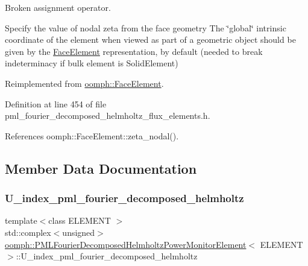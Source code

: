 Broken assignment operator. 

Specify the value of nodal zeta from the face geometry The \char`\"{}global\char`\"{} intrinsic coordinate of the element when viewed as part of a geometric object should be given by the \hyperlink{classoomph_1_1FaceElement}{Face\+Element} representation, by default (needed to break indeterminacy if bulk element is Solid\+Element) 

Reimplemented from \hyperlink{classoomph_1_1FaceElement_a58c9f93705c7741f76c8487d152e68a6}{oomph\+::\+Face\+Element}.



Definition at line 454 of file pml\+\_\+fourier\+\_\+decomposed\+\_\+helmholtz\+\_\+flux\+\_\+elements.\+h.



References oomph\+::\+Face\+Element\+::zeta\+\_\+nodal().



\subsection{Member Data Documentation}
\mbox{\label{classoomph_1_1PMLFourierDecomposedHelmholtzPowerMonitorElement_a27a8c49d898537496bb067b9b5d5281f}} 
\subsubsection{\texorpdfstring{U\+\_\+index\+\_\+pml\+\_\+fourier\+\_\+decomposed\+\_\+helmholtz}{U\_index\_pml\_fourier\_decomposed\_helmholtz}}
{\footnotesize\ttfamily template$<$class E\+L\+E\+M\+E\+NT $>$ \\
std\+::complex$<$unsigned$>$ \hyperlink{classoomph_1_1PMLFourierDecomposedHelmholtzPowerMonitorElement}{oomph\+::\+P\+M\+L\+Fourier\+Decomposed\+Helmholtz\+Power\+Monitor\+Element}$<$ E\+L\+E\+M\+E\+NT $>$\+::U\+\_\+index\+\_\+pml\+\_\+fourier\+\_\+decomposed\+\_\+helmholtz\hspace{0.3cm}{\ttfamily [protected]}}




